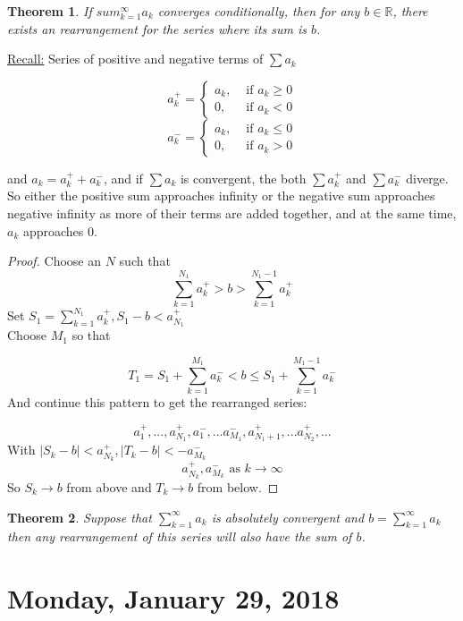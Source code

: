 \documentclass[12pt]{article}
\theoremstyle{plain}
\newtheorem{theorem}{Theorem}[section]
\theoremstyle{definition}
\begin{document}
\begin{theorem}
	If $sum^\infty_{k=1} a_k$ converges conditionally, then for any $b\in\mathbb{R}$, there exists an rearrangement for the series where its sum is $b$.
\end{theorem}

\underline{Recall:} Series of positive and negative terms of $\sum a_k$

$$a_k^+ = \begin{cases}
		a_k, &\text{ if } a_k \geq 0\\
		0, &\text{ if } a_k < 0
	\end{cases}
$$
$$a_k^- = \begin{cases}
		a_k, &\text{ if } a_k \leq 0\\
		0, &\text{ if } a_k > 0
	\end{cases}
$$

and $a_k = a_k^+ + a_k^-$, and if $\sum a_k$ is convergent, the both $\sum a_k^+$ and $\sum a_k^-$ diverge. So either the positive sum approaches infinity or the negative sum approaches negative infinity as more of their terms are added together, and at the same time, $a_k$ approaches 0.

\begin{proof}
	Choose an $N$ such that 
	$$\sum^{N_1}_{k=1} a^+_k > b > \sum^{N_1 - 1}_{k=1} a^+_k$$
	Set $S_1 = \sum^{N_1}_{k=1} a^+_k, S_1 - b < a^+_{N_1}$\\
	Choose $M_1$ so that
	
	$$T_1 = S_1 + \sum^{M_1}_{k=1} a^-_k < b \leq S_1 + \sum^{M_1 - 1}_{k=1} a^-_k$$
	And continue this pattern to get the rearranged series:
	
	$$a^+_1,...,a^+_{N_1}, a^-_1, ... a^-_{M_1}, a^+_{N_1 + 1}, ... a^+_{N_2},...$$
	With $|S_k - b| < a^+_{N_k}, |T_k - b| < -a^-_{M_k}$\\
	$$a^+_{N_k}, a^-_{M_k} \text{ as } k \to \infty$$
	So $S_k \to b$ from above and $T_k \to b$ from below.
\end{proof}

\begin{theorem}
	Suppose that 
	$\sum^\infty_{k=1} a_k$ is absolutely convergent and $b = \sum^\infty_{k=1} a_k$ then any rearrangement of this series will also have the sum of $b$.
\end{theorem}

\newpage

\section{Monday, January 29, 2018}
\end{document}

